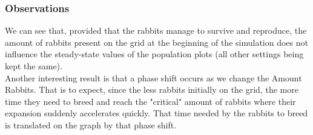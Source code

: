 \documentclass[11pt]{article}
\begin{document}
\subsubsection{Observations}
We can see that, provided that the rabbits manage to survive and reproduce, the amount of rabbits present on the grid at the beginning of the simulation does not influence the steady-state values of the population plots (all other settings being kept the same).\\

Another interesting result is that a phase shift occurs as we change the Amount Rabbits. That is to expect, since the less rabbits initially on the grid, the more time they need to breed and reach the "critical" amount of rabbits where their expansion suddenly accelerates quickly. That time needed by the rabbits to breed is translated on the graph by that phase shift.\\
\end{document}
